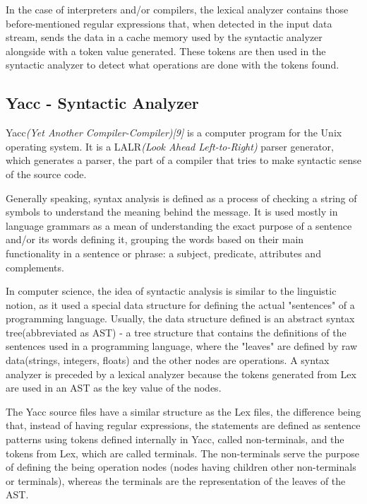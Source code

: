 \documentclass[12pt,a4paper,twoside]{report}
\begin{document}
In the case of interpreters and/or compilers, the lexical analyzer contains those before-mentioned regular expressions that, when detected in the input data stream, sends the data in a cache memory used by the syntactic analyzer alongside with a token value generated. These tokens are then used in the syntactic analyzer to detect what operations are done with the tokens found.
\subsection{Yacc - Syntactic Analyzer}

Yacc\textit{(Yet Another Compiler-Compiler)[9]} is a computer program for the Unix operating system. It is a LALR\textit{(Look Ahead Left-to-Right)} parser generator, which generates a parser, the part of a compiler that tries to make syntactic sense of the source code.

Generally speaking, syntax analysis is defined as a process of checking a string of symbols to understand the meaning behind the message. It is used mostly in language grammars as a mean of understanding the exact purpose of a sentence and/or its words defining it, grouping the words based on their main functionality in a sentence or phrase: a subject, predicate, attributes and complements. 

In computer science, the idea of syntactic analysis is similar to the linguistic notion, as it used a special data structure for defining the actual "sentences" of a programming language. Usually, the data structure defined is an abstract syntax tree(abbreviated as AST) - a tree structure that contains the definitions of the sentences used in a programming language, where the "leaves" are defined by raw data(strings, integers, floats) and the other nodes are operations. A syntax analyzer is preceded by a lexical analyzer because the tokens generated from Lex are used in an AST as the key value of the nodes. 

The Yacc source files have a similar structure as the Lex files, the difference being that, instead of having regular expressions, the statements are defined as sentence patterns using tokens defined internally in Yacc, called non-terminals, and the tokens from Lex, which are called terminals. The non-terminals serve the purpose of defining the being operation nodes (nodes having children other non-terminals or terminals), whereas the terminals are the representation of the leaves of the AST. 
\end{document}
